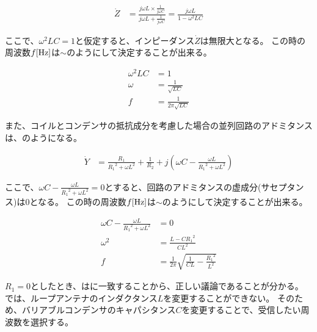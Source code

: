 \documentclass[report.tex]{subfiles}
\begin{document}
\begin{align}
	\dot{Z} & = \frac{j \omega L \times \frac{1}{j \omega C}}{j \omega L + \frac{1}{j \omega C}} = \frac{j \omega L}{1 - \omega^2 LC} \label{eq:impedance}
\end{align}

ここで、$\omega^2 LC = 1$と仮定すると、インピーダンス\(\dot{Z}\)は無限大となる。
この時の周波数\(f\rm{[Hz]}\)は\(\sim\)のようにして決定することが出来る。

\begin{align}
	\omega^2 LC & = 1                            \label{eq:resonance2} \\
	\omega      & = \frac{1}{\sqrt{LC}}                                \\
	f           & = \frac{1}{2 \pi \sqrt{LC}} \label{eq:resonance}
\end{align}

また、コイルとコンデンサの抵抗成分を考慮した場合の並列回路のアドミタンスは、のようになる。

\begin{align}
	\dot{Y} & = \frac{R_1}{{R_1}^2+ {\omega L}^2} + \frac{1}{R_2} + j(\omega C - \frac{\omega L}{{R_1}^2+ {\omega L}^2})\label{eq:impedance2}
\end{align}

ここで、$\omega C - \frac{\omega L}{{R_1}^2+ {\omega L}^2} = 0$とすると、回路のアドミタンスの虚成分(サセプタンス)は0となる。
この時の周波数\(f\rm{[Hz]}\)は\(\sim\)のようにして決定することが出来る。

\begin{align}
	\omega C - \frac{\omega L}{{R_1}^2+ {\omega L}^2} & = 0 \label{eq:kyousin}                                                           \\
	\omega ^2                                         & = \frac{L - {CR_1}^2}{CL^2}                                                      \\
	f                                                 & = \frac{1}{2 \pi} \sqrt{\frac{1}{CL} - {\frac{{R_1}^2}{L^2}}}\label{eq:kyousin2}
\end{align}

$R_1 = 0$としたとき、はに一致することから、正しい議論であることが分かる。
では、ループアンテナのインダクタンス\(L\)を変更することができない。
そのため、バリアブルコンデンサのキャパシタンス\(C\)を変更することで、受信したい周波数を選択する。
\end{document}
